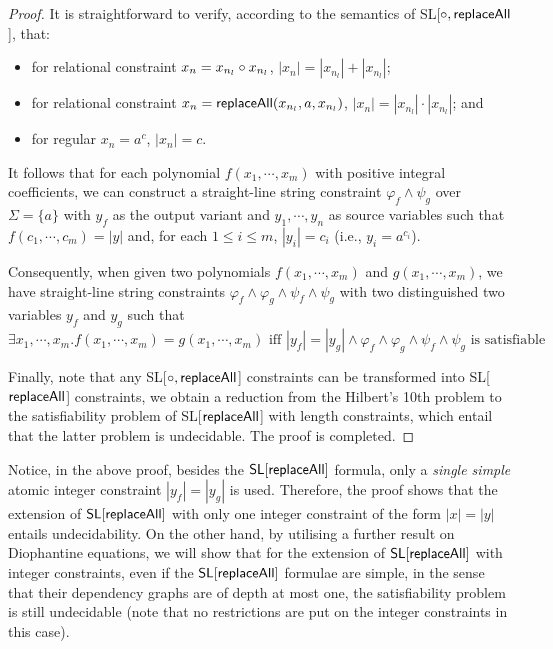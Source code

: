 \begin{proof}
{It is straightforward to verify, according to the semantics of SL[$\circ, \mathsf{replaceAll}$], that:
\begin{itemize}
	\item for relational constraint $x_n= x_{n_l}\circ x_{n_l}$, $|x_n|= |x_{n_l}|+|x_{n_l}|$; 
	\item for relational constraint $x_n= \mathsf{replaceAll}(x_{n_l}, a, x_{n_l})$,  $|x_n|= |x_{n_l}|\cdot |x_{n_l}|$; and 
	\item for regular $x_n=a^c$, $|x_n|=c$. 
\end{itemize}

It follows that for each polynomial $f(x_1, \cdots, x_m)$ with positive integral coefficients, we can construct a straight-line string constraint $\varphi_{f}\wedge\psi_g$ over $\Sigma=\{a\}$ with $y_f$ as the output variant and $y_1, \cdots, y_n$ as source variables such that
$f(c_1, \cdots, c_m)=|y|$ and, for each $1\leq i\leq m$, $|y_i|= c_i$ (i.e., $y_i=a^{c_i}$).  

Consequently, when given two polynomials $f(x_1, \cdots, x_m)$ and $g(x_1, \cdots, x_m)$, we have straight-line string constraints $\varphi_{f}\wedge \varphi_{g}\wedge \psi_{f}\wedge \psi_g$ with two distinguished two variables  $y_f$ and $y_g$ such that  
\[\exists x_1, \cdots, x_m. f(x_1, \cdots, x_m)=g(x_1, \cdots, x_m)\mbox{ iff } |y_f|=|y_g|\wedge \varphi_{f}\wedge \varphi_{g}\wedge \psi_{f}\wedge \psi_g\mbox{ is satisfiable} \]

Finally, note that any  SL[$\circ, \mathsf{replaceAll}$] constraints can be transformed into SL[$\mathsf{replaceAll}$] constraints, we obtain a reduction from the Hilbert's 10th problem to the satisfiability problem of  SL[$\mathsf{replaceAll}$] with length constraints, which entail that the latter problem is undecidable. The proof is completed. 
}
\end{proof}

Notice, in the above proof, besides the $\mathsf{SL}[\mathsf{replaceAll}]$ formula, only a \emph{single simple} atomic integer constraint $|y_f| = |y_g|$ is used. Therefore, the proof  shows that the extension of $\mathsf{SL}[\mathsf{replaceAll}]$ with only one integer constraint of the form $|x| = |y|$ entails undecidability.
On the other hand, by utilising a further result on Diophantine equations, we will show that for the extension of $\mathsf{SL}[\mathsf{replaceAll}]$ with integer constraints, even if the $\mathsf{SL}[\mathsf{replaceAll}]$ formulae are simple, in the sense that their dependency graphs are of depth at most one, the satisfiability problem is still undecidable (note that no restrictions are put on the integer constraints in this case).

